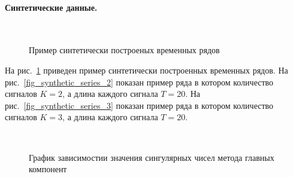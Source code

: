 \documentclass[12pt, twoside]{article}
\begin{document}
\paragraph{Синтетические данные.}

\begin{figure}[h!t]\center
{}
\\
\caption{Пример синтетически построеных временных рядов}
\label{fig_synthetic_series}
\end{figure}

На рис.~\ref{fig_synthetic_series} приведен пример синтетически построенных временных рядов. На рис.~\ref{fig_synthetic_series_2} показан пример ряда в котором количество сигналов $K = 2$, а длина каждого сигнала $T = 20$. На рис.~\ref{fig_synthetic_series_3} показан пример ряда в котором количество сигналов $K = 3$, а длина каждого сигнала $T = 20$. 

\begin{figure}[h!t]\center
{}
\\
\caption{График зависимостии значения сингулярных чисел метода главных компонент}
\label{fig_synthetic_lambda}
\end{figure}
\end{document}
